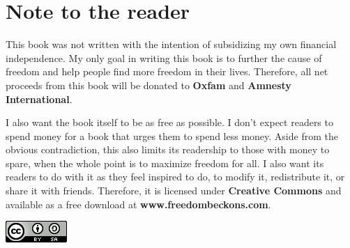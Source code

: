 \chapter{Note to the reader}
This book was not written with the intention of subsidizing my own financial independence. My only goal in writing this book is to further the cause of freedom and help people find more freedom in their lives. Therefore, all net proceeds from this book will be donated to \textbf{Oxfam} and \textbf{Amnesty International}.

I also want the book itself to be as free as possible. I don't expect readers to spend money for a book that urges them to spend less money. Aside from the obvious contradiction, this also limits its readership to those with money to spare, when the whole point is to maximize freedom for all. I also want its readers to do with it as they feel inspired to do, to modify it, redistribute it, or share it with friends. Therefore, it is licensed under \textbf{Creative Commons} and available as a free download at \textbf{www.freedombeckons.com}.

\includegraphics[bb=-125 40 0 0]{cc.png}
